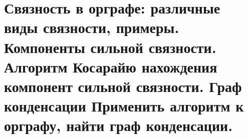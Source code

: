 \section{Связность в орграфе: различные виды связности, примеры. Компоненты сильной связности. 
Алгоритм Косарайю нахождения компонент сильной связности. Граф конденсации Применить 
алгоритм к орграфу, найти граф конденсации.}